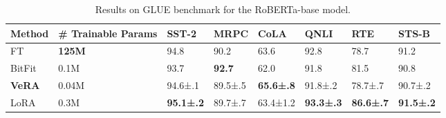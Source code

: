 \begin{table}
\caption{Results on GLUE benchmark for the RoBERTa-base model.}
\label{tab:glue_results}
\begin{tabular}{llllllll}
\toprule
Method & # Trainable Params & SST-2 & MRPC & CoLA & QNLI & RTE & STS-B \\
\midrule
FT & \bfseries 125M & 94.8 & 90.2 & 63.6 & 92.8 & 78.7 & 91.2 \\
BitFit & 0.1M & 93.7 & \bfseries 92.7 & 62.0 & 91.8 & 81.5 & 90.8 \\
\bfseries VeRA & 0.04M & 94.6±.1 & 89.5±.5 & \bfseries 65.6±.8 & 91.8±.2 & 78.7±.7 & 90.7±.2 \\
LoRA & 0.3M & \bfseries 95.1±.2 & 89.7±.7 & 63.4±1.2 & \bfseries 93.3±.3 & \bfseries 86.6±.7 & \bfseries 91.5±.2 \\
\bottomrule
\end{tabular}
\end{table}
